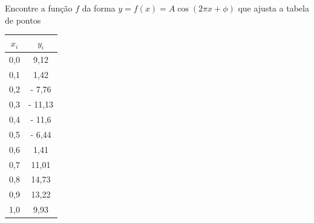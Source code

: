 \begin{ex}
Encontre a função $f$ da forma $y=f(x)=A\cos(2 \pi x+\phi)$ que ajusta a tabela de pontos
\begin{center}
\begin{tabular}{|c|c|}
\hline
$x_i$ & $y_i$\\
\hline
0,0  &   9,12\\
0,1  &    1,42\\
0,2  &  - 7,76\\
0,3  &  - 11,13\\
0,4  &  - 11,6\\
0,5  &  - 6,44\\
0,6  &    1,41\\
0,7  &    11,01\\
0,8  &    14,73\\
0,9  &    13,22\\
1,0  &    9,93 \\
\hline
\end{tabular}  
\end{center}
\end{ex}
